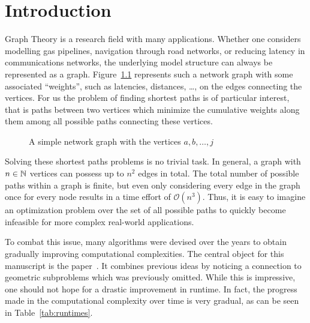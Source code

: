 \chapter{Introduction}

Graph Theory is a research field with many applications.
Whether one considers modelling gas pipelines, navigation through road networks, or reducing latency in communications networks, the underlying model structure can always be represented as a graph.
Figure~\ref{fig:graph-network} represents such a network graph with some associated ``weights'', such as latencies, distances, \dots, on the edges connecting the vertices.
For us the problem of finding shortest paths is of particular interest, that is paths between two vertices which minimize the cumulative weights along them among all possible paths connecting these vertices.

\begin{figure}[ht]
    \centering
    \caption{A simple network graph with the vertices $a, b,  \dots, j$\label{fig:graph-network}}
\end{figure}

Solving these shortest paths problems is no trivial task.
In general, a graph with $n \in \mathbb{N}$ vertices can possess up to $n^2$ edges in total.
The total number of possible paths within a graph is finite, but even only considering every edge in the graph once for every node results in a time effort of $\mathcal{O}\left( n^3 \right)$.
Thus, it is easy to imagine an optimization problem over the set of all possible paths to quickly become infeasible for more complex real-world applications.

To combat this issue, many algorithms were devised over the years to obtain gradually improving computational complexities.
The central object for this manuscript is the paper~\cite{Chan2007}.
It combines previous ideas by noticing a connection to geometric subproblems which was previously omitted.
While this is impressive, one should not hope for a drastic improvement in runtime.
In fact, the progress made in the computational complexity over time is very gradual, as can be seen in Table~\ref{tab:runtimes}.

